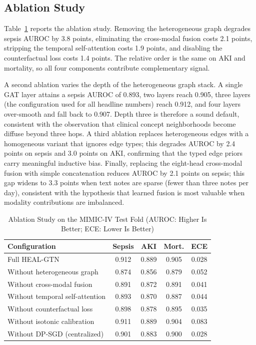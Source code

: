 \documentclass[conference]{IEEEtran}
\begin{document}
\subsection{Ablation Study}
Table~\ref{tab:ablation} reports the ablation study. Removing the heterogeneous graph degrades sepsis AUROC by 3.8 points, eliminating the cross-modal fusion costs 2.1 points, stripping the temporal self-attention costs 1.9 points, and disabling the counterfactual loss costs 1.4 points. The relative order is the same on AKI and mortality, so all four components contribute complementary signal.

A second ablation varies the depth of the heterogeneous graph stack. A single GAT layer attains a sepsis AUROC of 0.893, two layers reach 0.905, three layers (the configuration used for all headline numbers) reach 0.912, and four layers over-smooth and fall back to 0.907. Depth three is therefore a sound default, consistent with the observation that clinical concept neighborhoods become diffuse beyond three hops. A third ablation replaces heterogeneous edges with a homogeneous variant that ignores edge types; this degrades AUROC by 2.4 points on sepsis and 3.0 points on AKI, confirming that the typed edge priors carry meaningful inductive bias. Finally, replacing the eight-head cross-modal fusion with simple concatenation reduces AUROC by 2.1 points on sepsis; this gap widens to 3.3 points when text notes are sparse (fewer than three notes per day), consistent with the hypothesis that learned fusion is most valuable when modality contributions are imbalanced.

\begin{table}[t]
\caption{Ablation Study on the MIMIC-IV Test Fold (AUROC: Higher Is Better; ECE: Lower Is Better)}
\label{tab:ablation}
\centering
\footnotesize
\setlength{\tabcolsep}{4pt}
\begin{tabular}{@{}lcccc@{}}
\toprule
Configuration & Sepsis & AKI & Mort. & ECE \\
\midrule
Full HEAL-GTN & 0.912 & 0.889 & 0.905 & 0.028 \\
Without heterogeneous graph & 0.874 & 0.856 & 0.879 & 0.052 \\
Without cross-modal fusion & 0.891 & 0.872 & 0.891 & 0.041 \\
Without temporal self-attention & 0.893 & 0.870 & 0.887 & 0.044 \\
Without counterfactual loss & 0.898 & 0.878 & 0.895 & 0.035 \\
Without isotonic calibration & 0.911 & 0.889 & 0.904 & 0.083 \\
Without DP-SGD (centralized) & 0.901 & 0.883 & 0.900 & 0.028 \\
\bottomrule
\end{tabular}
\end{table}
\end{document}
